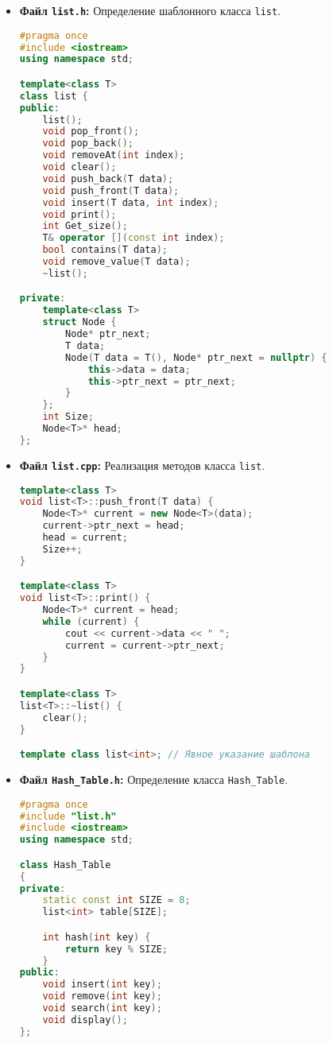 \documentclass[12pt,a4paper]{scrartcl}
\begin{document}
\begin{itemize}
    \item \textbf{Файл \texttt{list.h}:} Определение шаблонного класса \texttt{list}.
\begin{lstlisting}[language=C++, caption=Файл list.h]
#pragma once
#include <iostream>
using namespace std;

template<class T>
class list {
public:
	list();
	void pop_front();
	void pop_back();
	void removeAt(int index);
	void clear();
	void push_back(T data);
	void push_front(T data);
	void insert(T data, int index);
	void print();
	int Get_size();
	T& operator [](const int index);
	bool contains(T data);
	void remove_value(T data);
	~list();

private:
	template<class T>
	struct Node {
		Node* ptr_next;
		T data;
		Node(T data = T(), Node* ptr_next = nullptr) {
			this->data = data;
			this->ptr_next = ptr_next;
		}
	};
	int Size;
	Node<T>* head;
};
\end{lstlisting}

    \item \textbf{Файл \texttt{list.cpp}:} Реализация методов класса \texttt{list}.
\begin{lstlisting}[language=C++, caption=Фрагмент list.cpp]
template<class T>
void list<T>::push_front(T data) {
	Node<T>* current = new Node<T>(data);
	current->ptr_next = head;
	head = current;
	Size++;
}

template<class T>
void list<T>::print() {
	Node<T>* current = head;
	while (current) {
		cout << current->data << " ";
		current = current->ptr_next;
	}
}

template<class T>
list<T>::~list() {
	clear();
}

template class list<int>; // Явное указание шаблона
\end{lstlisting}

    \item \textbf{Файл \texttt{Hash_Table.h}:} Определение класса \texttt{Hash_Table}.
\begin{lstlisting}[language=C++, caption=Файл Hash_Table.h]
#pragma once
#include "list.h"
#include <iostream>
using namespace std;

class Hash_Table
{
private:
	static const int SIZE = 8;
	list<int> table[SIZE];

	int hash(int key) {
		return key % SIZE;
	}
public:
	void insert(int key);
	void remove(int key);
	void search(int key);
	void display();
};
\end{lstlisting}


\end{itemize}
\end{document}
